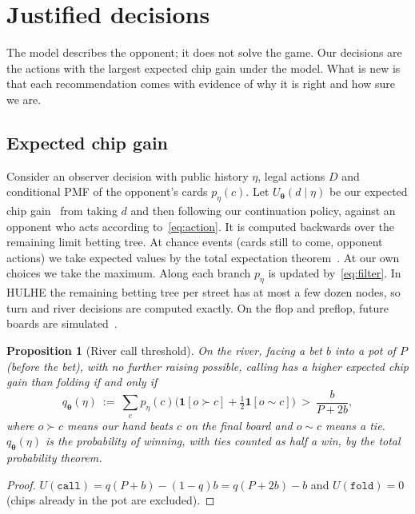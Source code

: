 \documentclass[11pt,a4paper]{article}
\newtheorem{proposition}{Proposition}
\newcommand{\1}{\mathbf{1}}
\newcommand{\BT}[1]{\cite[§#1]{bertsekas2000}}
\begin{document}
\section{Justified decisions}\label{sec:decisions}

The model describes the opponent; it does not solve the game. Our decisions
are the actions with the largest expected chip gain under the model. What is
new is that each recommendation comes with evidence of why it is right and how
sure we are.

\subsection{Expected chip gain}
Consider an observer decision with public history $\eta$, legal actions $D$
and conditional PMF of the opponent's cards $p_\eta(c)$. Let
$U_{\bm\theta}(d\mid\eta)$ be our expected chip gain~\BT{2.4} from taking $d$
and then following our continuation policy, against an opponent who acts
according to~\eqref{eq:action}. It is computed backwards over the remaining
limit betting tree. At chance events (cards still to come, opponent actions)
we take expected values by the total expectation theorem~\BT{2.6}. At our own
choices we take the maximum. Along each branch $p_\eta$ is updated
by~\eqref{eq:filter}. In HULHE the remaining betting tree per street has at
most a few dozen nodes, so turn and river decisions are computed exactly. On
the flop and preflop, future boards are simulated~\BT{2.7}.

\begin{proposition}[River call threshold]\label{prop:river}
On the river, facing a bet $b$ into a pot of $P$ (before the bet), with no
further raising possible, calling has a higher expected chip gain than folding
if and only if
\begin{equation}
  q_{\bm\theta}(\eta)\ :=\ \sum_c p_\eta(c)\Big(\1[o\succ c]+\tfrac12\1[o\sim c]\Big)
  \ >\ \frac{b}{P+2b},
\end{equation}
where $o\succ c$ means our hand beats $c$ on the final board and $o\sim c$
means a tie. $q_{\bm\theta}(\eta)$ is the probability of winning, with ties
counted as half a win, by the total probability theorem.
\end{proposition}
\begin{proof}
$U(\mathtt{call})=q(P+b)-(1-q)b=q(P+2b)-b$ and $U(\mathtt{fold})=0$ (chips already
in the pot are excluded).
\end{proof}
\end{document}
